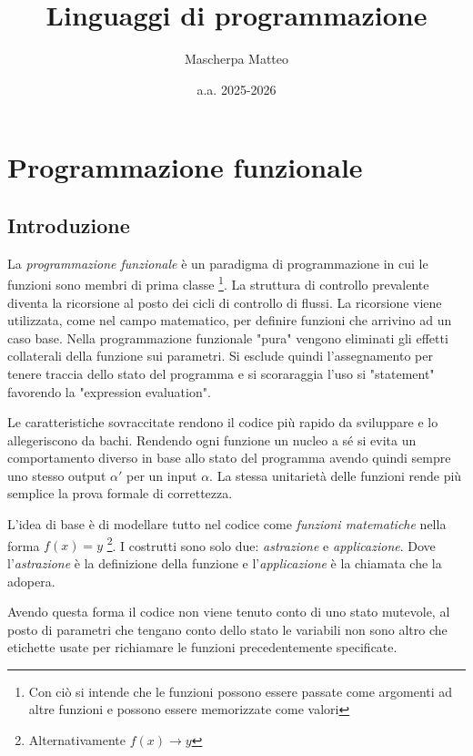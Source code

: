 \documentclass{article}
\title{Linguaggi di programmazione}
\author{Mascherpa Matteo}
\date{a.a. 2025-2026}
\begin{document}
\maketitle
\tableofcontents
\newpage
\section{Programmazione funzionale}

\subsection{Introduzione}

\hspace*{0.5cm} La \textit{programmazione funzionale} è un paradigma di programmazione in cui le funzioni sono membri di prima classe \footnote{Con ciò si intende che le funzioni possono essere passate come argomenti ad altre funzioni e possono essere memorizzate come valori}.
La struttura di controllo prevalente diventa la ricorsione al posto dei cicli di controllo di flussi.
La ricorsione viene utilizzata, come nel campo matematico, per definire funzioni che arrivino ad un caso base.
Nella programmazione funzionale "pura" vengono eliminati gli effetti collaterali della funzione sui parametri.
Si esclude quindi l'assegnamento per tenere traccia dello stato del programma e si scoraraggia l'uso si "statement" favorendo la "expression evaluation".

\vspace*{0.5cm}

\hspace*{0.5cm} Le caratteristiche sovraccitate rendono il codice più rapido da sviluppare e lo allegeriscono da bachi.
Rendendo ogni funzione un nucleo a sé si evita un comportamento diverso in base allo stato del programma avendo quindi sempre uno stesso output $\alpha'$ per un input $\alpha$.
La stessa unitarietà delle funzioni rende più semplice la prova formale di correttezza.

\vspace*{0.5cm}

\hspace*{0.5cm}L'idea di base è di modellare tutto nel codice come \textit{funzioni matematiche} nella forma $f(x) = y$ \footnote{Alternativamente $f(x) \to y$}. I costrutti sono solo due: \textit{astrazione} e \textit{applicazione}. 
Dove l'\textit{astrazione} è la definizione della funzione e l'\textit{applicazione} è la chiamata che la adopera.

\hspace*{0.5cm}Avendo questa forma il codice non viene tenuto conto di uno stato mutevole, al posto di parametri che tengano conto dello stato le variabili non sono altro che etichette usate per richiamare le funzioni precedentemente specificate.
\end{document}

